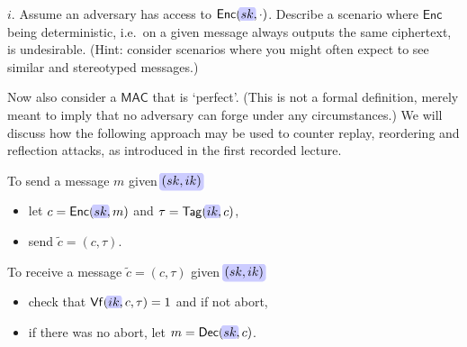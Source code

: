 \documentclass[final]{problemset}
\newcommand\mybox[2][]{\tikz[overlay]\node[fill=blue!20,inner sep=2pt, anchor=text, rectangle, rounded corners=1mm,#1] {\ensuremath{#2}};\phantom{#2}}
\newcommand{\MAC}{\ensuremath{\mathsf{MAC}}}
\newcommand{\Tag}{\ensuremath{\mathsf{Tag}}}
\newcommand{\Vf}{\ensuremath{\mathsf{Vf}}}
\newcommand{\Enc}{\ensuremath{\mathsf{Enc}}}
\newcommand{\Dec}{\ensuremath{\mathsf{Dec}}}
\begin{document}
    $i$. Assume an adversary has access to $\Enc(\mybox{sk}, \cdot)$.
    Describe a scenario where $\Enc$ being deterministic, i.e.~on a given message always outputs the same ciphertext, is undesirable. (Hint: consider scenarios where you might often expect to see similar and stereotyped messages.)


    Now also consider a $\MAC$ that is `perfect'.
    (This is not a formal definition, merely meant to imply that no adversary can forge under any circumstances.)
    We will discuss how the following approach may be used to counter replay, reordering and reflection attacks, as introduced in the first recorded lecture.

    To send a message $m$ given $\mybox{(sk, ik)}$
    \begin{itemize}
        \item let $c = \Enc(\mybox{sk}, m)$ and $\tau = \Tag(\mybox{ik}, c)$,
        \item send $\tilde{c} = (c, \tau)$.
    \end{itemize}

    To receive a message $\tilde{c} = (c, \tau)$ given $\mybox{(sk, ik)}$
    \begin{itemize}
        \item check that $\Vf(\mybox{ik}, c, \tau) = 1$ and if not abort,
        \item if there was no abort, let $m = \Dec(\mybox{sk}, c)$.
    \end{itemize}
\end{document}
